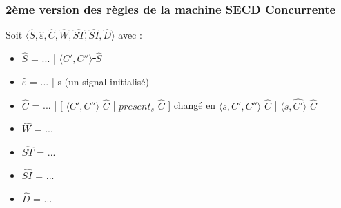 \documentclass[10pt,a4paper]{article}
\begin{document}
				
				
				\subsubsection{2ème version des règles de la machine SECD Concurrente}\label{SECDConc2}
				Soit $\langle\widehat{S},\widehat{\varepsilon},\widehat{C},\widehat{W},\widehat{ST},\widehat{SI},\widehat{D}\rangle$ avec :
				
				\begin{itemize}
					\item[] $\widehat{S}$  = ... | \sout{$\langle C',C''\rangle$ $\widehat{S}$}
					\item[] $\widehat{\varepsilon}$ = ... | s (un signal initialisé)
					\item[] $\widehat{C}$  = ... | [ $\langle C',C''\rangle$ $\widehat{C}$ | $present_{s}$ $\widehat{C}$ ] changé en $\langle s,C',C''\rangle$ $\widehat{C}$ | $\langle s,\widehat{C'}\rangle$ $\widehat{C}$ 
					\item[] $\widehat{W}$  = ...
					\item[] $\widehat{ST}$ = ...
					\item[] $\widehat{SI}$ = ...
					\item[] $\widehat{D}$  = ...
				\end{itemize}
				\bigbreak
				
\end{document}
